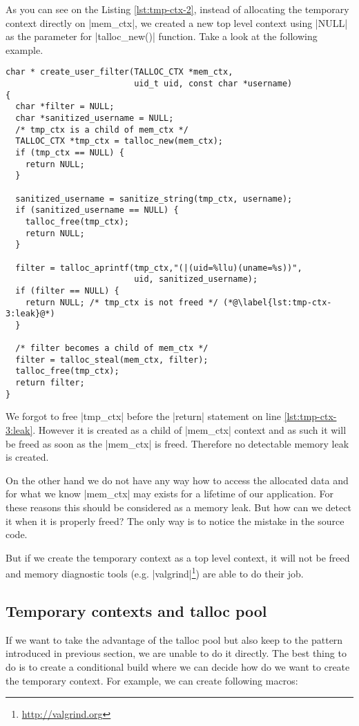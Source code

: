 As you can see on the Listing \ref{lst:tmp-ctx-2}, instead of allocating the
temporary context directly on |mem_ctx|, we created a new top level context
using |NULL| as the parameter for |talloc_new()| function. Take a look at the
following example.

\begin{lstlisting}[caption={Temporary context \#3},label=lst:tmp-ctx-3]
char * create_user_filter(TALLOC_CTX *mem_ctx,
                          uid_t uid, const char *username)
{
  char *filter = NULL;
  char *sanitized_username = NULL;
  /* tmp_ctx is a child of mem_ctx */
  TALLOC_CTX *tmp_ctx = talloc_new(mem_ctx);
  if (tmp_ctx == NULL) {
    return NULL;
  }
  
  sanitized_username = sanitize_string(tmp_ctx, username);
  if (sanitized_username == NULL) {
    talloc_free(tmp_ctx);
    return NULL;
  }
  
  filter = talloc_aprintf(tmp_ctx,"(|(uid=%llu)(uname=%s))",
                          uid, sanitized_username);
  if (filter == NULL) {
    return NULL; /* tmp_ctx is not freed */ (*@\label{lst:tmp-ctx-3:leak}@*)
  }
  
  /* filter becomes a child of mem_ctx */
  filter = talloc_steal(mem_ctx, filter);
  talloc_free(tmp_ctx);
  return filter;
}
\end{lstlisting}

We forgot to free |tmp_ctx| before the |return| statement on line
\ref{lst:tmp-ctx-3:leak}. However it is created as a child of |mem_ctx| context
and as such it will be freed as soon as the |mem_ctx| is freed. Therefore no
detectable memory leak is created.

On the other hand we do not have any way how to access the allocated data
and for what we know |mem_ctx| may exists for a lifetime of our application.
For these reasons this should be considered as a memory leak. But how can we
detect it when it is properly freed? The only way is to notice the mistake in
the source code.

But if we create the temporary context as a top level context, it will not be
freed and memory diagnostic tools
(e.g. |valgrind|\footnote{\url{http://valgrind.org}}) are able to do their job.

\subsection{Temporary contexts and talloc pool}
\label{talloc:subsec:tmp-ctx-and-pool}

If we want to take the advantage of the talloc pool but also keep to the
pattern introduced in previous section, we are unable to do it directly. The
best thing to do is to create a conditional build where we can decide how do we
want to create the temporary context. For example, we can create following
macros:

